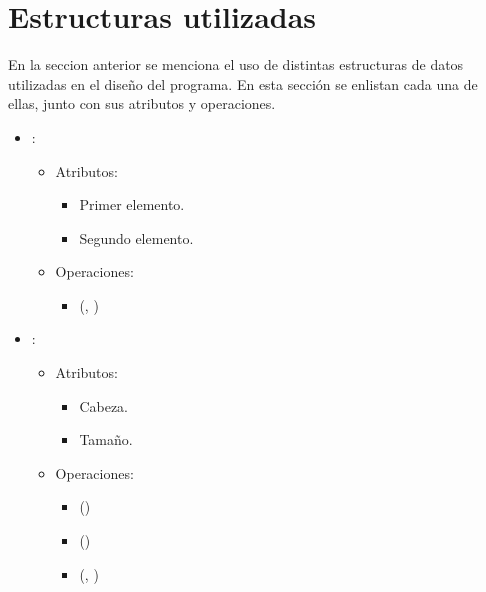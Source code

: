 \documentclass[11pt]{article}
\begin{document}
   \section{Estructuras utilizadas}

   En la seccion anterior se menciona el uso de distintas estructuras de datos
   utilizadas en el diseño del programa. En esta sección se enlistan cada una
   de ellas, junto con sus atributos y operaciones.

   \begin{itemize}
      \item {}:
      \begin{itemize}
         \item Atributos:

         \begin{itemize}
            \item Primer elemento.
            \item Segundo elemento.
         \end{itemize}
      \end{itemize}

      \begin{itemize}
         \item Operaciones:

         \begin{itemize}
            \item {}(, )
         \end{itemize}
      \end{itemize}

      \item {}:

      \begin{itemize}
         \item Atributos:

         \begin{itemize}
            \item Cabeza.
            \item Tamaño.
         \end{itemize}
      \end{itemize}

      \begin{itemize}
         \item Operaciones:

         \begin{itemize}
            \item {}()
            \item {}()
            \item {}(, )
         \end{itemize}
      \end{itemize}


\end{itemize}
\end{document}
